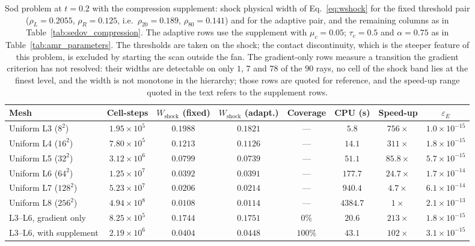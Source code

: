 \documentclass[a4paper]{cas-sc}
\begin{document}
\begin{table}[pos=htbp]
	\centering
	\caption{Sod problem at $t=0.2$ with the compression supplement: shock
	physical width of Eq.~\eqref{eq:wshock} for the fixed threshold pair
	($\rho_L=0.2055$, $\rho_R=0.125$, i.e.\ $\rho_{20}=0.189$,
	$\rho_{80}=0.141$) and for the adaptive pair, and the remaining columns as
	in Table~\ref{tab:sedov_compression}. The adaptive rows use the supplement
	with $\mu_c=0.05$; $\tau_c=0.5$ and $\alpha=0.75$ as in
	Table~\ref{tab:amr_parameters}. The thresholds are taken on the
	shock; the contact discontinuity, which is the steeper feature of this
	problem, is excluded by starting the scan outside the fan. The
	gradient-only rows measure a transition the gradient criterion has not
	resolved: their widths are detectable on only $1$, $7$ and $78$ of the
	$90$ rays, no cell of the shock band lies at the finest level, and the
	width is not monotone in the hierarchy; those rows are quoted for
	reference, and the speed-up range quoted in the text refers to the
	supplement rows.}
	\label{tab:sod_compression}
	\begin{tabular}{lccccccc}
		\hline
		Mesh & Cell-steps & $W_{\mathrm{shock}}$ (fixed) & $W_{\mathrm{shock}}$ (adapt.) & Coverage & CPU (s) & Speed-up & $\varepsilon_E$ \\
		\hline
		Uniform L3 ($8^2$)   & $1.95\times10^{5}$ & $0.1988$ & $0.1821$ & ---      & $5.8$    & $756\times$   & $1.0\times10^{-15}$ \\
		Uniform L4 ($16^2$)  & $7.80\times10^{5}$ & $0.1213$ & $0.1126$ & ---      & $14.1$   & $311\times$   & $1.8\times10^{-15}$ \\
		Uniform L5 ($32^2$)  & $3.12\times10^{6}$ & $0.0799$ & $0.0739$ & ---      & $51.1$   & $85.8\times$  & $5.7\times10^{-15}$ \\
		Uniform L6 ($64^2$)  & $1.25\times10^{7}$ & $0.0392$ & $0.0391$ & ---      & $177.7$  & $24.7\times$  & $1.7\times10^{-14}$ \\
		Uniform L7 ($128^2$) & $5.23\times10^{7}$ & $0.0206$ & $0.0214$ & ---      & $940.4$  & $4.7\times$   & $6.1\times10^{-14}$ \\
		Uniform L8 ($256^2$) & $4.94\times10^{8}$ & $0.0108$ & $0.0114$ & ---      & $4384.7$ & $1\times$     & $2.1\times10^{-13}$ \\
		L3--L6, gradient only   & $8.25\times10^{5}$ & $0.1744$ & $0.1751$ & $0\%$    & $20.6$   & $213\times$   & $1.8\times10^{-15}$ \\
		L3--L6, with supplement & $2.19\times10^{6}$ & $0.0404$ & $0.0448$ & $100\%$  & $43.1$   & $102\times$   & $3.1\times10^{-15}$ \\

\end{tabular}
\end{table}
\end{document}

